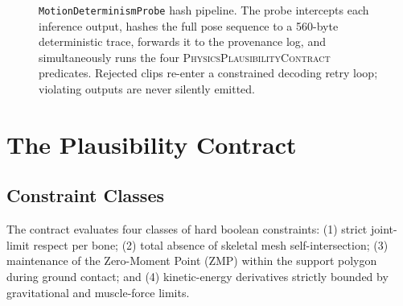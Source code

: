 \documentclass[sigconf,nonacm]{acmart}
\newcommand{\plausibility}{\textsc{PhysicsPlausibilityContract}}
\begin{document}
\begin{figure}[t]
  \centering
  \caption{\texttt{MotionDeterminismProbe} hash pipeline.
    The probe intercepts each inference output,
    hashes the full pose sequence to a 560-byte deterministic trace,
    forwards it to the provenance log, and simultaneously runs the
    four \plausibility{} predicates.
    Rejected clips re-enter a constrained decoding retry
    loop; violating outputs are never silently emitted.}
  \label{fig:probe}
\end{figure}

\section{The Plausibility Contract}
\label{sec:contract}

\subsection{Constraint Classes}
The contract evaluates four classes of hard boolean constraints: (1) strict joint-limit respect per bone; (2) total absence of skeletal mesh self-intersection; (3) maintenance of the Zero-Moment Point (ZMP) within the support polygon during ground contact; and (4) kinetic-energy derivatives strictly bounded by gravitational and muscle-force limits. %
\end{document}
